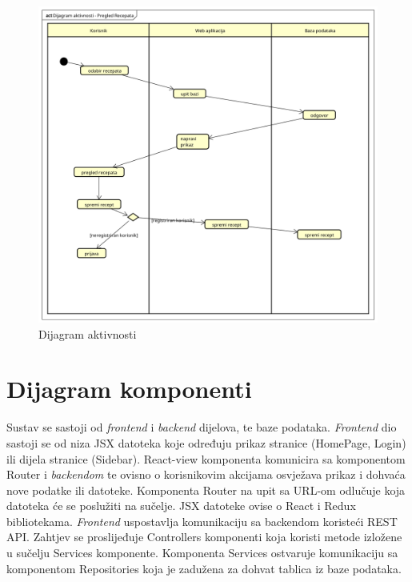 	\begin{figure}[H]
		\includegraphics[scale= 0.4]{slike/Dijagram aktivnosti - Pregled Recepata.png}
		\centering
		\caption{Dijagram aktivnosti}
		\label{fig:Dijagram aktivnosti}
	\end{figure} 
\eject

\section{Dijagram komponenti}


{Sustav se sastoji od \textit{frontend} i \textit{backend} dijelova, te baze podataka. \textit{Frontend} dio sastoji se od niza JSX datoteka koje određuju prikaz stranice (HomePage, Login) ili dijela stranice (Sidebar). React-view komponenta komunicira sa komponentom Router i \textit{backendom} te ovisno o korisnikovim akcijama osvježava prikaz i dohvaća nove podatke ili datoteke. Komponenta Router na upit sa URL-om odlučuje koja datoteka će se poslužiti na sučelje. JSX datoteke ovise o React i Redux bibliotekama. \textit{Frontend} uspostavlja komunikaciju sa backendom koristeći REST API. Zahtjev se proslijeđuje Controllers komponenti koja koristi metode izložene u sučelju Services komponente. Komponenta Services ostvaruje komunikaciju sa komponentom Repositories koja je zadužena za dohvat tablica iz baze podataka.}

